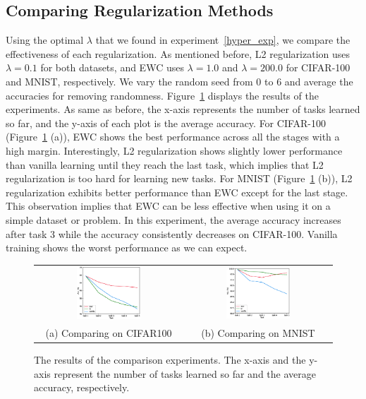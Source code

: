 \documentclass[final]{cvpr}
\begin{document}
\subsection{Comparing Regularization Methods}
Using the optimal $\lambda$ that we found in experiment~\ref{hyper_exp}, we compare the effectiveness of each regularization. As mentioned before, L2 regularization uses $\lambda=0.1$ for both datasets, and EWC uses $\lambda=1.0$ and $\lambda=200.0$ for CIFAR-100 and MNIST, respectively. We vary the random seed from 0 to 6 and average the accuracies for removing randomness. Figure~\ref{comp} displays the results of the experiments. As same as before, the x-axis represents the number of tasks learned so far, and the y-axis of each plot is the average accuracy.
For CIFAR-100 (Figure~\ref{comp} (a)), EWC shows the best performance across all the stages with a high margin. Interestingly, L2 regularization shows slightly lower performance than vanilla learning until they reach the last task, which implies that L2 regularization is too hard for learning new tasks. 
For MNIST (Figure~\ref{comp} (b)), L2 regularization exhibits better performance than EWC except for the last stage. This observation implies that EWC can be less effective when using it on a simple dataset or problem. In this experiment, the average accuracy increases after task 3 while the accuracy consistently decreases on CIFAR-100. Vanilla training shows the worst performance as we can expect.

\begin{figure}[t]
    \centering
	\begin{tabular}{c@{\hskip0.5cm}c}
		\includegraphics[width=0.45\textwidth]{resources/comp_CIFAR.eps}&%
        \includegraphics[width=0.45\textwidth]{resources/comp_MNIST.eps}\\%
        (a) Comparing on CIFAR100 & (b) Comparing on MNIST\\
	\end{tabular}\vspace{0.2cm}
	\caption{The results of the comparison experiments. The x-axis and the y-axis represent the number of tasks learned so far and the average accuracy, respectively.}
	\label{comp}
\end{figure}
\end{document}
